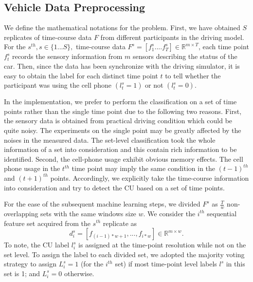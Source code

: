 \documentclass[journal]{IEEEtran}
\begin{document}
\subsection{Vehicle Data Preprocessing }
We define the mathematical notations for the problem. First, we have obtained $S$ replicates of time-course data $F$ from different participants in the driving model.  For the  $s^{th}, s \in\{1...S\},$   time-course data $F^{s}=[f^s_1....f^s_T]  \in \mathbb{R}^{m\times T}$,  each time point $f^s_t$ records the sensory information from $m$ sensors describing the status of the car. Then, since the data has been synchronize with the driving simulator, it is easy to obtain the label for each distinct time point $t$ to tell whether the participant was using the cell phone $(l^s_t=1)$ or not $(l^s_t=0)$.   

In the implementation, we prefer to perform the classification on a set of time points rather than the single time point due to the following two reasons. First, the sensory data is obtained from practical driving condition which could be quite noisy. The experiments on the single point may be greatly affected by the
 noises in the measured data. The set-level classification took the whole information of a set into consideration and this contain rich information to be identified. Second, the cell-phone usage exhibit obvious memory effects. The cell phone usage in the $t^{th}$ time point may imply the same condition in the $(t-1)^{th}$ and $(t+1)^{th}$ points. Accordingly, we explicitly take the time-course information into consideration and try to detect the CU based on a set of time points. 

For the ease of the subsequent machine learning steps, we divided $F^{s}$ as $\frac{T}{w}$  non-overlapping sets with the same windows size $w$.  We consider the $i^{th}$ sequential feature set acquired from the $s^{th}$ replicate as
 \begin{equation}
 d^{s}_i=[f_{(i-1)*w+1},...,f_{i*w}] \in \mathbb{R}^{m\times w}.
 \label{eqs:d}
 \end{equation}
 To note, the CU label $l^{s}_i$ is assigned at the time-point resolution while not on the set level.  To assign the label to each divided set, we adopted the majority voting strategy to assign  $L^{s}_i=1$ (for the $i^{th}$ set) if most time-point level labels $l^{s}$ in this set is 1; and $L^{s}_i=0$ otherwise. 
\end{document}
